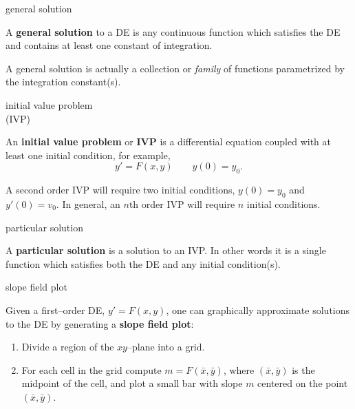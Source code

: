 \documentclass[avery5371,grid]{flashcards}
\newcommand{\defn}[1]{\textbf{#1}}
\begin{document}
\begin{flashcard}[Definition]{general solution}

  A \defn{general solution} to a DE is any continuous function which
  satisfies the DE and contains at least one constant of integration.

  \bigskip

  A general solution is actually a collection or \emph{family} of
  functions parametrized by the integration constant(s).

\end{flashcard}

\begin{flashcard}[Definition]{initial value problem \\(IVP)}

  An \defn{initial value problem} or \defn{IVP} is a differential
  equation coupled with at least one initial condition, for example,
  \[
    y' = F(x,y) \qquad y(0) = y_0.
  \]

  A second order IVP will require two initial conditions, $y(0)=y_0$
  and $y'(0)=v_0$. In general, an $n$th order IVP will require $n$
  initial conditions.

\end{flashcard}

\begin{flashcard}[Definition]{particular solution}

  A \defn{particular solution} is a solution to an IVP. In other words
  it is a single function which satisfies both the DE and any initial
  condition(s).

\end{flashcard}

\begin{flashcard}[Algorithm]{slope field plot}

  Given a first--order DE, $y' = F(x,y)$, one can graphically
  approximate solutions to the DE by generating a \defn{slope field
    plot}:
  \begin{enumerate}
  \item Divide a region of the $xy$--plane into a grid.
  \item For each cell in the grid compute $m = F(\bar{x}, \bar{y})$,
    where $(\bar{x}, \bar{y})$ is the midpoint of the cell, and plot a
    small bar with slope $m$ centered on the point
    $(\bar{x}, \bar{y})$.
  \end{enumerate}

\end{flashcard}
\end{document}
